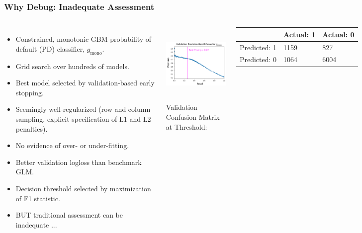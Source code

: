 \documentclass[11pt,
               aspectratio=169,
               hyperref={colorlinks}
               ]{beamer}
\begin{document}
			\begin{frame}

					\frametitle{Why Debug: Inadequate Assessment}

					\begin{columns}
						
						\centering
						\begin{itemize}
							\item \scriptsize Constrained, monotonic GBM probability of default (PD) classifier, $g_{\text{mono}}$.
							\item Grid search over hundreds of models. 
							\item Best model selected by validation-based early stopping.
							\item Seemingly well-regularized (row and column sampling, explicit specification of L1 and L2 penalties).
							\item No evidence of over- or under-fitting.
							\item Better validation logloss than benchmark GLM.
							\item Decision threshold selected by maximization of F1 statistic.
							\item BUT traditional assessment can be inadequate ... 
						\end{itemize}\normalsize
						
						\vspace{20pt}
							\centering
							\includegraphics[height=110pt]{../img/pr_auc.png}\\
							\tiny
							\vspace{5pt}
							Validation Confusion Matrix at Threshold:\vspace{-7pt}
							\begin{table}
								\hspace{7pt}
								\begin{tabular}{ | p{1.3cm} | p{1cm} | p{1.3cm} | }
									\hline
								 	& Actual: 1 & Actual: 0 \\ 
									\hline
									Predicted: 1 & 1159	& 827 \\
									\hline
									Predicted: 0 & 1064	& 6004 \\
									\hline
								\end{tabular}	
							\end{table}	
						\normalsize
				
					\end{columns}
							
			\end{frame}
\end{document}
